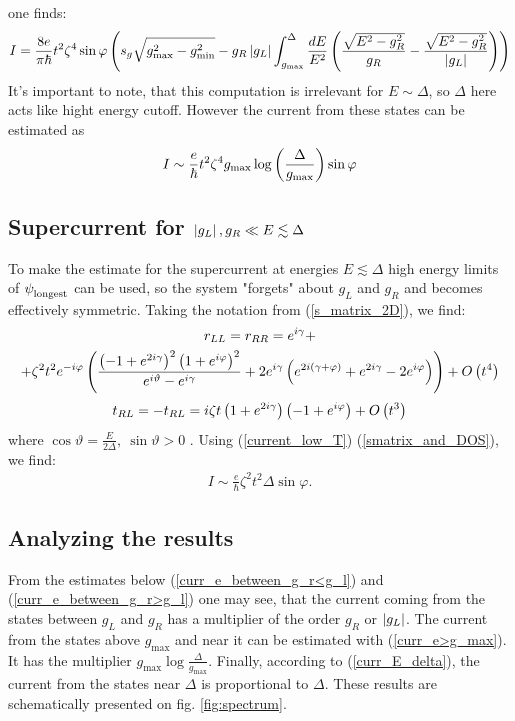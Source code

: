 one finds:
\begin{multline}
I
=
	\frac{8e}{\pi\hbar}t^2\zeta^4
	\sin \varphi
	\left(
	s_g\sqrt{g_{\mathrm{max}}^2-g_{\mathrm{min}}^2}
-
g_{R}\left|g_{L}\right|
\int_{g_{\mathrm{\mathrm{max}}}}^{\Delta}
\frac{dE}{E^2}
\left(
	\frac{\sqrt{E^2-g_{R}^2}}{g_{R}}
	-
	\frac{\sqrt{E^2-g_{R}^2}}{\left|g_{L}\right|}
\right)
	\right)
\end{multline}
It's important to note, that this computation is irrelevant for $ E\sim\Delta $, so $ \Delta $ here acts like hight energy cutoff. However the current from these states can be estimated as
\begin{gather}
\label{curr_e>g_max}
	I
	\sim
	\frac{e}{\hbar}t^2\zeta^4
	g_\mathrm{max}
	\log\left( \frac{\Delta}{g_\mathrm{max}}\right)
	\sin \varphi
\end{gather} 

\subsection{Supercurrent for $\left|g_L\right|, g_R\ll E \lesssim \Delta $}

\label{subsec:supercurrent_sim_Delta}

To make the estimate for the supercurrent at energies $ E\lesssim \Delta$ high energy limits of $ \psi_{\mathrm{longest}}^{\mathrm{}} $ can be used, so the system "forgets" about $ g_L $ and $ g_R $ and becomes effectively symmetric. Taking the notation from (\ref{s_matrix_2D}), we find:
\begin{multline}
	r_{LL}=r_{RR}
	=
	e^{i \gamma }+
	\\
	+
	\zeta ^2 t^2 e^{-i \varphi } \left(\frac{\left(-1+e^{2 i \gamma }\right)^2 \left(1+e^{i \varphi }\right)^2}{e^{i \vartheta }-e^{i \gamma }}+2 e^{i \gamma } \left(e^{2 i (\gamma +\varphi )}+e^{2 i \gamma }-2 e^{i \varphi }\right)\right)
	+O\left(t^4\right)
	\end{multline}
\begin{gather}
	t_{RL}=-t_{RL}
	=
	i \zeta  t\left(1+e^{2 i \gamma }\right)  \left(-1+e^{i \varphi }\right)
	+
	O\left(t^3 	\right)
\end{gather}
where $\cos\vartheta =\frac{E}{2\Delta},~ \sin\vartheta>0$ .
Using (\ref{current_low_T}) (\ref{smatrix_and_DOS}), we find:
\begin{gather}
\label{curr_E_delta}
I
\sim
	\frac{e}{\hbar}
	\zeta ^2 t^2\Delta
	\sin\varphi.
\end{gather}

\subsection{Analyzing the results}
From the estimates below 	(\ref{curr_e_between_g_r<g_l}) and (\ref{curr_e_between_g_r>g_l}) one may see, that the current coming from the states between $ g_L $ and $ g_R $ has a multiplier of the order $ g_{R} $ or $ \left|g_L\right| $. The current from the states above $ g_{\max} $ and near it can be estimated with (\ref{curr_e>g_max}). It has the multiplier $ g_{\mathrm{max}}\log\frac{\Delta}{g_{\mathrm{max}}} $. Finally, according to (\ref{curr_E_delta}), the current from the states near $ \Delta $ is proportional to $ \Delta $. These results are schematically presented on fig. \ref{fig:spectrum}.


